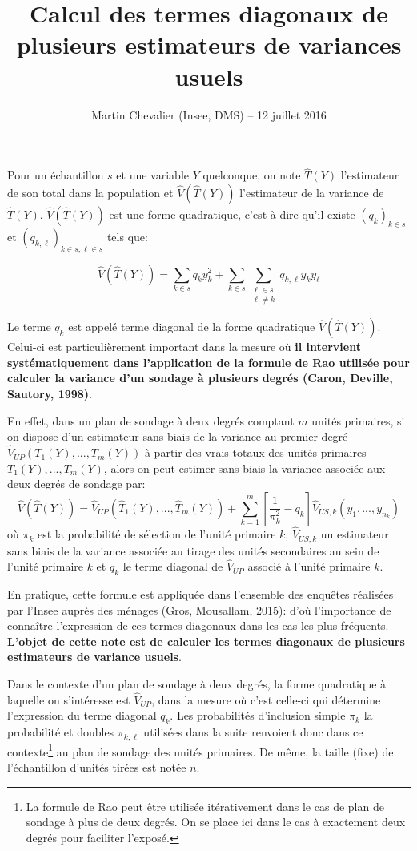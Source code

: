\documentclass[a4paper,12pt]{article}
\title{Calcul des termes diagonaux de plusieurs estimateurs de variances usuels}
\author{Martin Chevalier (Insee, DMS) -- 12 juillet 2016}
\date{}
\begin{document}
\maketitle

Pour un échantillon $s$ et une variable $Y$ quelconque, on note $\hat{T}(Y)$ l'estimateur de son total dans la population et $\hat{V}(\hat{T}(Y))$ l'estimateur de la variance de $\hat{T}(Y)$. $\hat{V}(\hat{T}(Y))$ est une forme quadratique, c'est-à-dire qu'il existe $(q_k)_{k \in s}$ et $(q_{k,\ell})_{k \in s, \ell \in s}$ tels que: 

\begin{equation*}
\hat{V}(\hat{T}(Y)) = \sum_{k \in s}q_k y_k^2 + \sum_{k \in s} \sum_{\substack{\ell \in s \\ \ell \neq k}} q_{k,\ell}y_k y_\ell
\end{equation*}

Le terme $q_k$ est appelé terme diagonal de la forme quadratique $\hat{V}(\hat{T}(Y))$. Celui-ci est particulièrement important dans la mesure où \textbf{il intervient systématiquement dans l'application de la formule de Rao utilisée pour calculer la variance d'un sondage à plusieurs degrés (Caron, Deville, Sautory, 1998)}. 

\bigskip En effet, dans un plan de sondage à deux degrés comptant $m$ unités primaires, si on dispose d'un estimateur sans biais de la variance au premier degré $\hat{V}_{UP}(T_1(Y),...,T_m(Y))$ à partir des vrais totaux des unités primaires $T_1(Y),..., T_m(Y)$, alors on peut estimer sans biais la variance associée aux deux degrés de sondage par: $$\hat{V}(\hat{T}(Y)) = \hat{V}_{UP}(\hat{T}_1(Y),...,\hat{T}_m(Y)) + \sum_{k = 1}^{m}\left[\dfrac{1}{\pi_k^2} - q_k\right]\hat{V}_{US,k}(y_1,...,y_{n_k})$$ où $\pi_k$ est la probabilité de sélection de l'unité primaire $k$, $  \hat{V}_{US,k}$ un estimateur sans biais de la variance associée au tirage des unités secondaires au sein de l'unité primaire $k$ et $q_k$ le terme diagonal de $\hat{V}_{UP}$ associé à l'unité primaire $k$.

\bigskip En pratique, cette formule est appliquée dans l'ensemble des enquêtes réalisées par l'Insee auprès des ménages (Gros, Mousallam, 2015): d'où l'importance de connaître l'expression de ces termes diagonaux dans les cas les plus fréquents. \textbf{L'objet de cette note est de calculer les termes diagonaux de plusieurs estimateurs de variance usuels}. 

\bigskip Dans le contexte d'un plan de sondage à deux degrés, la forme quadratique à laquelle on s'intéresse est $\hat{V}_{UP}$, dans la mesure où c'est celle-ci qui détermine l'expression du terme diagonal $q_k$. Les probabilités d'inclusion simple $\pi_k$ la probabilité et doubles $\pi_{k,\ell}$ utilisées dans la suite renvoient donc dans ce contexte\footnote{La formule de Rao peut être utilisée itérativement dans le cas de plan de sondage à plus de deux degrés. On se place ici dans le cas à exactement deux degrés pour faciliter l'exposé.} au plan de sondage des unités primaires. De même, la taille (fixe) de l'échantillon d'unités tirées est notée $n$.
\end{document}
